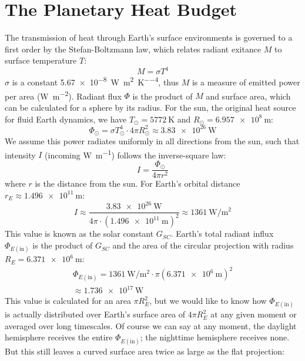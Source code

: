 \chapter{The Planetary Heat Budget}
The transmission of heat through Earth's surface environments is governed to a first order by the Stefan-Boltzmann law, which relates radiant exitance $M$ to surface temperature $T$:
\begin{equation}
M=\sigma T^4
\end{equation}
$\sigma$ is a constant \qty{5.67e-8}{\watt\per\square\meter\per\K\tothe{4}}, thus $M$ is a measure of emitted power per area (\unit{\watt\per\meter\squared}). Radiant flux $\Phi$ is the product of $M$ and surface area, which can be calculated for a sphere by its radius. For the sun, the original heat source for fluid Earth dynamics, we have $T_\odot=\qty{5772}{\K}$ and $R_\odot=\qty{6.957e8}{\m}$:
\begin{equation}
\Phi_\odot=\sigma T_\odot^4\cdot4\pi R^2_\odot
\approx\qty{3.83e26}{\W}
\end{equation}
We assume this power radiates uniformly in all directions from the sun, such that intensity $I$ (incoming \unit{\W\per\meter}) follows the inverse-square law:
\begin{equation}
I=\frac{\Phi_\odot}{4\pi r^{2}}
\end{equation}
where $r$ is the distance from the sun. For Earth's orbital distance $r_E\approx\qty{1.496e11}{\meter}$:
\begin{equation}
I\approx\frac{\qty{3.83e26}{\W}}{4\pi\cdot(\qty{1.496e11}{\m})^2}\approx\qty{1361}{\W\per\square\meter}
\end{equation}
This value is known as the solar constant $G_{SC}$. Earth's total radiant influx $\Phi_{E(\text{in})}$ is the product of $G_{SC}$ and the area of the circular projection with radius $R_E=\qty{6.371e6}{\m}$:
\begin{multline}
\Phi_{E(\text{in})}=\qty{1361}{\W\per\square\meter}\cdot\pi(\qty{6.371e6}{\m})^2\\
\approx\qty{1.736e17}{\W}
\end{multline}
This value is calculated for an area $\pi R_E^2$, but we would like to know how $\Phi_{E(\text{in})}$ is actually distributed over Earth's surface area of $4\pi R_E^2$ at any given moment or averaged over long timescales. Of course we can say at any moment, the daylight hemisphere receives the entire $\Phi_{E(\text{in})}$; the nighttime hemisphere receives none. But this still leaves a curved surface area twice as large as the flat projection:

